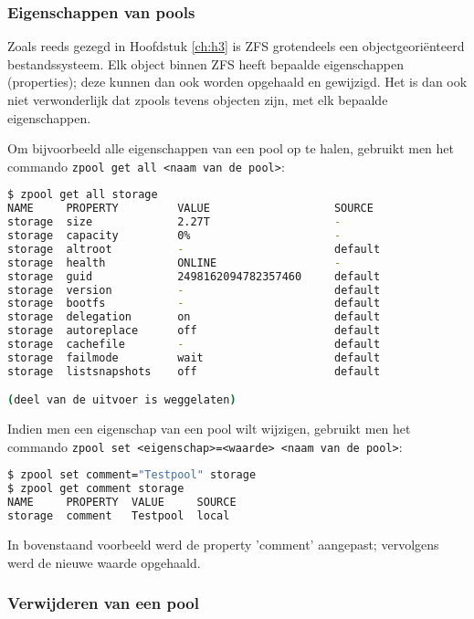\subsubsection{Eigenschappen van pools}

Zoals reeds gezegd in Hoofdstuk \ref{ch:h3} is ZFS grotendeels een objectgeoriënteerd bestandssysteem. Elk object binnen ZFS heeft bepaalde eigenschappen (properties); deze kunnen dan ook worden opgehaald en gewijzigd. Het is dan ook niet verwonderlijk dat zpools tevens objecten zijn, met elk bepaalde eigenschappen.

Om bijvoorbeeld alle eigenschappen van een pool op te halen, gebruikt men het commando \texttt{zpool get all <naam van de pool>}:

\begin{lstlisting}[language=bash,style=command_style]
$ zpool get all storage
NAME     PROPERTY         VALUE                   SOURCE
storage  size             2.27T                   -
storage  capacity         0%                      -
storage  altroot          -                       default
storage  health           ONLINE                  -
storage  guid             2498162094782357460     default
storage  version          -                       default
storage  bootfs           -                       default
storage  delegation       on                      default
storage  autoreplace      off                     default
storage  cachefile        -                       default
storage  failmode         wait                    default
storage  listsnapshots    off                     default

(deel van de uitvoer is weggelaten)
\end{lstlisting}

Indien men een eigenschap van een pool wilt wijzigen, gebruikt men het commando \texttt{zpool set <eigenschap>=<waarde> <naam van de pool>}: 

\begin{lstlisting}[language=bash,style=command_style]
$ zpool set comment="Testpool" storage
$ zpool get comment storage
NAME     PROPERTY  VALUE     SOURCE
storage  comment   Testpool  local
\end{lstlisting}

In bovenstaand voorbeeld werd de property 'comment' aangepast; vervolgens werd de nieuwe waarde opgehaald.

\subsubsection{Verwijderen van een pool}

